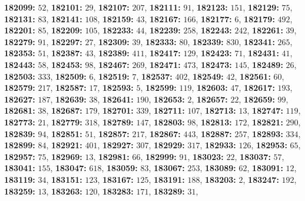 \textsf{\bfseries 182099:} $52$, \textsf{\bfseries 182101:} $29$, \textsf{\bfseries 182107:} $207$, \textsf{\bfseries 182111:} $91$, \textsf{\bfseries 182123:} $151$, \textsf{\bfseries 182129:} $75$, \textsf{\bfseries 182131:} $83$, \textsf{\bfseries 182141:} $108$, \textsf{\bfseries 182159:} $43$, \textsf{\bfseries 182167:} $166$, \textsf{\bfseries 182177:} $6$, \textsf{\bfseries 182179:} $492$, \textsf{\bfseries 182201:} $85$, \textsf{\bfseries 182209:} $105$, \textsf{\bfseries 182233:} $44$, \textsf{\bfseries 182239:} $258$, \textsf{\bfseries 182243:} $242$, \textsf{\bfseries 182261:} $39$, \textsf{\bfseries 182279:} $91$, \textsf{\bfseries 182297:} $27$, \textsf{\bfseries 182309:} $39$, \textsf{\bfseries 182333:} $80$, \textsf{\bfseries 182339:} $830$, \textsf{\bfseries 182341:} $265$, \textsf{\bfseries 182353:} $51$, \textsf{\bfseries 182387:} $43$, \textsf{\bfseries 182389:} $411$, \textsf{\bfseries 182417:} $129$, \textsf{\bfseries 182423:} $71$, \textsf{\bfseries 182431:} $41$, \textsf{\bfseries 182443:} $58$, \textsf{\bfseries 182453:} $98$, \textsf{\bfseries 182467:} $269$, \textsf{\bfseries 182471:} $473$, \textsf{\bfseries 182473:} $145$, \textsf{\bfseries 182489:} $26$, \textsf{\bfseries 182503:} $333$, \textsf{\bfseries 182509:} $6$, \textsf{\bfseries 182519:} $7$, \textsf{\bfseries 182537:} $402$, \textsf{\bfseries 182549:} $42$, \textsf{\bfseries 182561:} $60$, \textsf{\bfseries 182579:} $217$, \textsf{\bfseries 182587:} $17$, \textsf{\bfseries 182593:} $5$, \textsf{\bfseries 182599:} $119$, \textsf{\bfseries 182603:} $47$, \textsf{\bfseries 182617:} $193$, \textsf{\bfseries 182627:} $187$, \textsf{\bfseries 182639:} $38$, \textsf{\bfseries 182641:} $190$, \textsf{\bfseries 182653:} $2$, \textsf{\bfseries 182657:} $22$, \textsf{\bfseries 182659:} $99$, \textsf{\bfseries 182681:} $38$, \textsf{\bfseries 182687:} $179$, \textsf{\bfseries 182701:} $339$, \textsf{\bfseries 182711:} $107$, \textsf{\bfseries 182713:} $13$, \textsf{\bfseries 182747:} $119$, \textsf{\bfseries 182773:} $21$, \textsf{\bfseries 182779:} $318$, \textsf{\bfseries 182789:} $147$, \textsf{\bfseries 182803:} $98$, \textsf{\bfseries 182813:} $172$, \textsf{\bfseries 182821:} $290$, \textsf{\bfseries 182839:} $94$, \textsf{\bfseries 182851:} $51$, \textsf{\bfseries 182857:} $217$, \textsf{\bfseries 182867:} $443$, \textsf{\bfseries 182887:} $257$, \textsf{\bfseries 182893:} $334$, \textsf{\bfseries 182899:} $84$, \textsf{\bfseries 182921:} $401$, \textsf{\bfseries 182927:} $307$, \textsf{\bfseries 182929:} $317$, \textsf{\bfseries 182933:} $126$, \textsf{\bfseries 182953:} $65$, \textsf{\bfseries 182957:} $75$, \textsf{\bfseries 182969:} $13$, \textsf{\bfseries 182981:} $66$, \textsf{\bfseries 182999:} $91$, \textsf{\bfseries 183023:} $22$, \textsf{\bfseries 183037:} $57$, \textsf{\bfseries 183041:} $155$, \textsf{\bfseries 183047:} $618$, \textsf{\bfseries 183059:} $83$, \textsf{\bfseries 183067:} $253$, \textsf{\bfseries 183089:} $62$, \textsf{\bfseries 183091:} $12$, \textsf{\bfseries 183119:} $34$, \textsf{\bfseries 183151:} $123$, \textsf{\bfseries 183167:} $125$, \textsf{\bfseries 183191:} $188$, \textsf{\bfseries 183203:} $2$, \textsf{\bfseries 183247:} $192$, \textsf{\bfseries 183259:} $13$, \textsf{\bfseries 183263:} $120$, \textsf{\bfseries 183283:} $171$, \textsf{\bfseries 183289:} $31$, 
